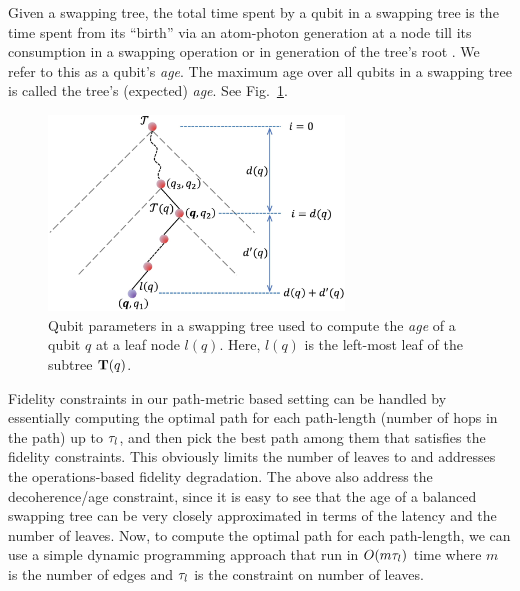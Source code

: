 \begin{definition}
    Given a swapping tree, the total time spent by a qubit in a swapping
    tree is the time spent from its ``birth'' via an atom-photon \eps generation at a node till its consumption
    in a swapping operation or in generation of the tree's root \eps. 
    We refer to this as a qubit's \textit{age}. The maximum age over all qubits 
    in a swapping tree is called the tree's (expected) \textit{age}. See Fig.~\ref{fig:swapping_age}.
\end{definition}

\begin{figure}
    \centering
    \includegraphics[width=0.7\textwidth]{chapters/swappingtrees/figures/qubit-age.jpg}
  \caption{Qubit parameters in a swapping tree used to compute the \emph{age} of a qubit $q$ at a leaf node $l(q)$. Here, $l(q)$ is the left-most leaf of the subtree $\mathbf{T}(q)$.}
  \label{fig:swapping_age}
\end{figure}

Fidelity constraints in our path-metric based setting can be handled by essentially
computing the optimal path for each path-length (number of hops in the path) up to
$\tau_l$, and then pick the best path among them that satisfies the fidelity constraints.
This obviously limits the number of leaves to \fidl and addresses the operations-based
fidelity degradation. The above also address the decoherence/age
constraint, since it is easy to see %
that the age of a balanced swapping tree can be very closely 
approximated in terms of the latency and the number of leaves.
Now, to compute the optimal path for each path-length, we can use a simple dynamic
programming approach that run in $O(m\tau_l)$ time where $m$ is the number of edges 
and $\tau_l$ is the constraint on number of leaves. 